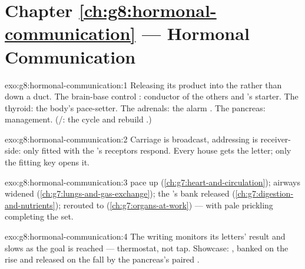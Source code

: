 \section*{Chapter \ref{ch:g8:hormonal-communication} --- Hormonal Communication}

\begin{solution}{exo:g8:hormonal-communication:1}
Releasing its product into the  rather than down a
duct. The brain-base control : conductor of the
others and 's starter. The thyroid: the body's
pace-setter. The adrenals: the alarm . The
pancreas:  management. (/: the
cycle and rebuild .)
\end{solution}

\begin{solution}{exo:g8:hormonal-communication:2}
Carriage is broadcast, addressing is receiver-side: only
 fitted with the 's receptors respond. Every
house gets the letter; only the fitting key opens it.
\end{solution}

\begin{solution}{exo:g8:hormonal-communication:3}
 pace up (\cref{ch:g7:heart-and-circulation});
airways widened (\cref{ch:g7:lungs-and-gas-exchange});
the 's  bank released
(\cref{ch:g7:digestion-and-nutrients});  rerouted to
 (\cref{ch:g7:organs-at-work}) --- with pale
prickling  completing the set.
\end{solution}

\begin{solution}{exo:g8:hormonal-communication:4}
The writing  monitors its letters' result and slows
as the goal is reached --- thermostat, not tap. Showcase:
 , banked on the rise and released on the
fall by the pancreas's paired .
\end{solution}

